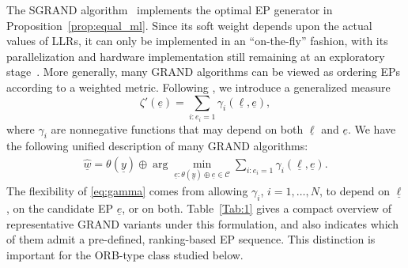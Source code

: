 \documentclass[letterpaper,draftclsnofoot,onecolumn]{IEEEtran}
\begin{document}
The SGRAND algorithm~\cite{solomon2020SGRAND} implements the optimal EP generator in Proposition~\ref{prop:equal_ml}. Since its soft weight depends upon the actual values of LLRs, it can only be implemented in an ``on-the-fly'' fashion, with its parallelization and hardware implementation still remaining at an exploratory stage~\cite{wan2025parallelism}. More generally, many GRAND algorithms can be viewed as
ordering EPs according to a weighted metric. Following \cite{liu2022orbgrand}, we introduce a generalized measure
\begin{equation}
\zeta'(\underline{e})
=\sum_{i:e_i=1}\gamma_i(\underline{\ell},\underline{e}),
\end{equation}
where $\gamma_i$ are nonnegative functions that may depend on both
$\underline{\ell}$ and $\underline{e}$. We have the following unified description of many GRAND algorithms:
\begin{align}\label{eq:gamma}
    \hat{\underline{w}} = \theta(\underline{y})\oplus \arg\min_{\underline{e}:\theta(\underline{y})\oplus \underline{e}\in \mathcal{C}}\sum_{i:e_i=1} \gamma_{i}(\underline{\ell},\underline{e}).
\end{align}
The flexibility of \eqref{eq:gamma} comes from allowing $\gamma_i$, $i=1,\ldots,N$, to depend on $\underline{\ell}$, on the candidate EP $\underline{e}$, or on both. Table~\ref{Tab:1} gives a compact overview of representative GRAND variants under this formulation, and also indicates which of them admit a pre-defined, ranking-based EP sequence. This distinction is important for the ORB-type class studied below.
\end{document}
